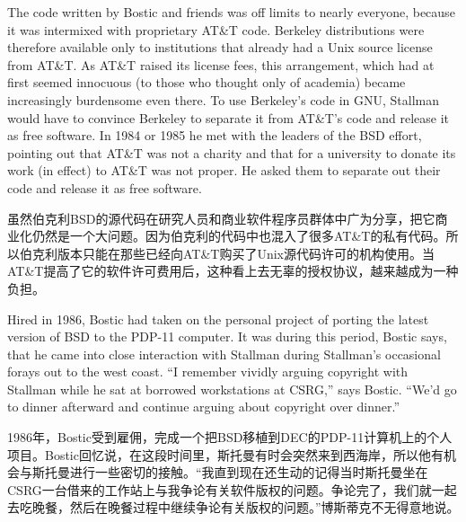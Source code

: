 \ifdefined\eng
The code written by Bostic and friends was off limits to nearly everyone, because it was intermixed with proprietary AT\&T code. Berkeley distributions were therefore available only to institutions that already had a Unix source license from AT\&T. As AT\&T raised its license fees, this arrangement, which had at first seemed innocuous (to those who thought only of academia) became increasingly burdensome even there.  To use Berkeley's code in GNU, Stallman would have to convince Berkeley to separate it from AT\&T's code and release it as free software.  In 1984 or 1985 he met with the leaders of the BSD effort, pointing out that AT\&T was not a charity and that for a university to donate its work (in effect) to AT\&T was not proper.  He asked them to separate out their code and release it as free software.
\fi

\ifdefined\chs
虽然伯克利BSD的源代码在研究人员和商业软件程序员群体中广为分享，把它商业化仍然是一个大问题。因为伯克利的代码中也混入了很多AT\&T的私有代码。所以伯克利版本只能在那些已经向AT\&T购买了Unix源代码许可的机构使用。当AT\&T提高了它的软件许可费用后，这种看上去无辜的授权协议，越来越成为一种负担。
\fi

\ifdefined\eng
Hired in 1986, Bostic had taken on the personal project of porting the latest version of BSD to the PDP-11 computer. It was during this period, Bostic says, that he came into close interaction with Stallman during Stallman's occasional forays out to the west coast. ``I remember vividly arguing copyright with Stallman while he sat at borrowed workstations at CSRG,'' says Bostic. ``We'd go to dinner afterward and continue arguing about copyright over dinner.''
\fi

\ifdefined\chs
1986年，Bostic受到雇佣，完成一个把BSD移植到DEC的PDP-11计算机上的个人项目。Bostic回忆说，在这段时间里，斯托曼有时会突然来到西海岸，所以他有机会与斯托曼进行一些密切的接触。``我直到现在还生动的记得当时斯托曼坐在CSRG一台借来的工作站上与我争论有关软件版权的问题。争论完了，我们就一起去吃晚餐，然后在晚餐过程中继续争论有关版权的问题。''博斯蒂克不无得意地说。
\fi

